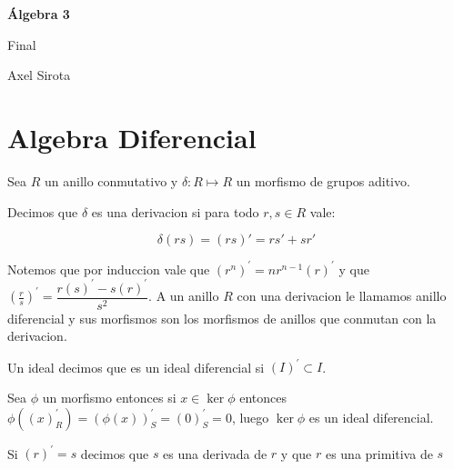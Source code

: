 \documentclass[11pt]{article}
\newcommand{\derivation}[1]{\left(#1\right)^\prime}
\numberwithin{theorem}{subsection}
\newenvironment{definition}[1][Definici\'on]{\begin{trivlist}
		\item[\hskip \labelsep {\bfseries #1}]}{\end{trivlist}}
\newenvironment{remark}[1][Observaci\'on]{\begin{trivlist}
		\item[\hskip \labelsep {\bfseries #1}]}{\end{trivlist}}
\begin{document}
	
	\pagestyle{empty}
	\pagestyle{fancy}
	\fancyfoot[CO]{\slshape \thepage}
	\renewcommand{\headrulewidth}{0pt}
	
	
	
	\centerline{\bf \'Algebra 3}
	\centerline{\sc Final}
	\centerline{\sc Axel Sirota}
	
	
\section{Algebra Diferencial}

Sea $R$ un anillo conmutativo y $\delta: R \mapsto R$ un morfismo de grupos aditivo.

\begin{definition}
	Decimos que $\delta$ es una derivacion si para todo $r,s \in R$ vale:
	
	\begin{equation}
		\delta(rs) = (rs)\prime = rs' + sr'
	\end{equation}
	
\end{definition}

Notemos que por induccion vale que $\derivation{r^n} = nr^{n-1}\derivation{r}$ y que $\derivation{\frac{r}{s}} = \dfrac{r \derivation{s} - s\derivation{r}}{s^2}$. A un anillo $R$ con una derivacion le llamamos anillo diferencial y sus morfismos son los morfismos de anillos que conmutan con la derivacion.

Un ideal decimos que es un ideal diferencial si $\derivation{I} \subset I$.

\begin{remark}
	Sea $\phi$ un morfismo entonces si $x \in \ker \phi$ entonces $\phi\left(\derivation{x}_R\right) = \derivation{\phi(x)}_S = \derivation{0}_S = 0$, luego $\ker \phi$ es un ideal diferencial.
\end{remark}

Si $\derivation{r} = s$ decimos que $s$ es una derivada de $r$ y que $r$ es una primitiva de $s$
\end{document}
